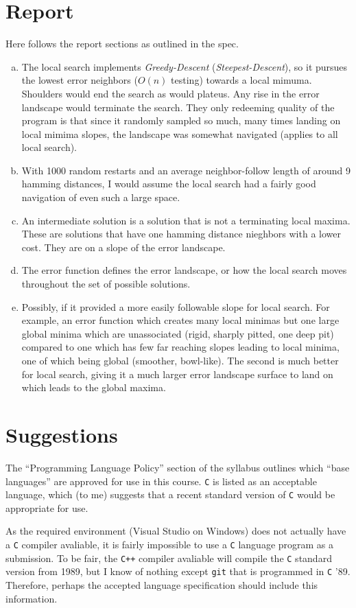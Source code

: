 \documentclass{article}
\begin{document}
	\section{Report}

	Here follows the report sections as outlined in the spec.

	\begin{enumerate}[(a)]
		\item{
			The local search implements {\it Greedy-Descent} ({\it Steepest-Descent}), so it pursues the lowest error neighbors ($O(n)$ testing) towards a local mimuma. Shoulders would end the search as would plateus. Any rise in the error landscape would terminate the search. They only redeeming quality of the program is that since it randomly sampled so much, many times landing on local mimima slopes, the landscape was somewhat navigated (applies to all local search).
		}
		\item{
			With 1000 random restarts and an average neighbor-follow length of around 9 hamming distances, I would assume the local search had a fairly good navigation of even such a large space.
		}
		\item{
			An intermediate solution is a solution that is not a terminating local maxima. These are solutions that have one hamming distance nieghbors with a lower cost. They are on a slope of the error landscape.
		}
		\item{
			The error function defines the error landscape, or how the local search moves throughout the set of possible solutions.
		}
		\item{
			Possibly, if it provided a more easily followable slope for local search. For example, an error function which creates many local minimas but one large global minima which are unassociated (rigid, sharply pitted, one deep pit) compared to one which has few far reaching slopes leading to local minima, one of which being global (smoother, bowl-like). The second is much better for local search, giving it a much larger error landscape surface to land on which leads to the global maxima.
		}
	\end{enumerate}

	\section{Suggestions}

	The ``Programming Language Policy'' section of the syllabus outlines which ``base languages'' are approved for use in this course. {\tt C} is listed as an acceptable language, which (to me) suggests that a recent standard version of {\tt C} would be appropriate for use.

	As the required environment (Visual Studio on Windows) does not actually have a {\tt C} compiler avaliable, it is fairly impossible to use a {\tt C} language program as a submission. To be fair, the {\tt C++} compiler avaliable will compile the {\tt C} standard version from 1989, but I know of nothing except {\tt git} that is programmed in {\tt C} '89. Therefore, perhaps the accepted language specification should include this information.
\end{document}
